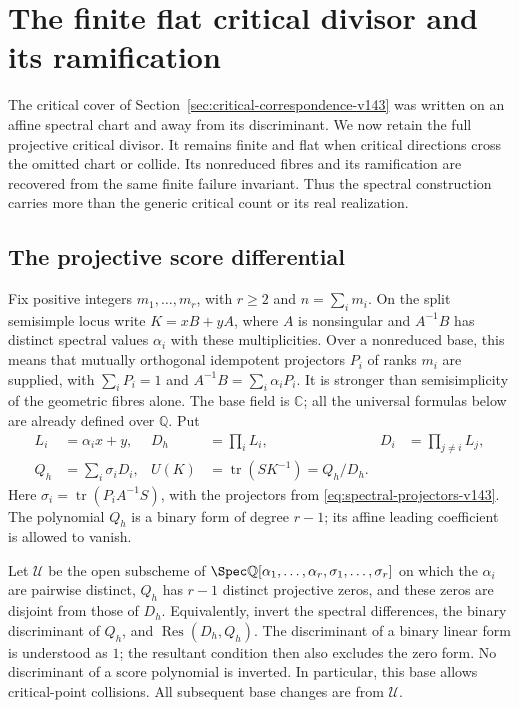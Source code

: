 \section{The finite flat critical divisor and its ramification}
\label{sec:projective-critical-v144}

The critical cover of Section~\ref{sec:critical-correspondence-v143}
was written on an affine spectral chart and away from its discriminant.
We now retain the full projective critical divisor.  It remains finite
and flat when critical directions cross the omitted chart or collide.
Its nonreduced fibres and its ramification are recovered from the same
finite failure invariant.  Thus the spectral construction carries more
than the generic critical count or its real realization.

\subsection{The projective score differential}
Fix positive integers \(m_1,\ldots,m_r\), with \(r\ge2\) and
\(n=\sum_i m_i\).  On the split semisimple locus write
\(K=xB+yA\), where \(A\) is nonsingular and \(A^{-1}B\) has
distinct spectral values \(\alpha_i\) with these multiplicities.
Over a nonreduced base, this means that mutually orthogonal idempotent
projectors \(P_i\) of ranks \(m_i\) are supplied, with
\(\sum_iP_i=1\) and \(A^{-1}B=\sum_i\alpha_iP_i\).
It is stronger than semisimplicity of the geometric fibres alone.
The base field is \(\mathbb C\); all the universal formulas below
are already defined over \(\mathbb Q\).  Put
\begin{equation}\label{eq:binary-spectral-data-v144}
 \begin{aligned}
 L_i&=\alpha_i x+y,&
 D_h&=\prod_i L_i,& D_i&=\prod_{j\ne i}L_j,\\
 Q_h&=\sum_i\sigma_iD_i,&
 U(K)&=\operatorname{tr}(SK^{-1})=Q_h/D_h.
 \end{aligned}
\end{equation}
Here \(\sigma_i=\operatorname{tr}(P_iA^{-1}S)\), with the
projectors from \eqref{eq:spectral-projectors-v143}.  The polynomial
\(Q_h\) is a binary form of degree \(r-1\); its affine leading
coefficient is allowed to vanish.

Let \(\mathscr U\) be the open subscheme of
\(\Spec\mathbb Q[\alpha_1,\ldots,\alpha_r,\sigma_1,\ldots,\sigma_r]\)
on which the \(\alpha_i\) are pairwise distinct, \(Q_h\) has
\(r-1\) distinct projective zeros, and these zeros are disjoint from
those of \(D_h\).  Equivalently, invert the spectral differences,
the binary discriminant of \(Q_h\), and
\(\operatorname{Res}(D_h,Q_h)\).  The discriminant of a binary
linear form is understood as \(1\); the resultant condition then
also excludes the zero form.  No discriminant of a score polynomial
is inverted.  In particular, this base allows critical-point
collisions.  All subsequent base changes are from \(\mathscr U\).

